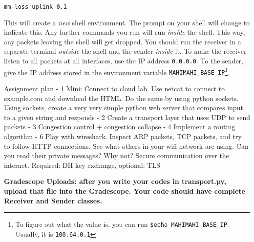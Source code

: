 \documentclass{article}
\begin{document}
\begin{verbatim}
mm-loss uplink 0.1
\end{verbatim}

This will create a \emph{new} shell environment. The prompt on your shell will change to indicate this. Any further commands you run will run \emph{inside} the shell. This way, any packets leaving the shell will get dropped. You should run the receiver in a separate terminal \emph{outside} the shell and the sender \emph{inside} it. To make the receiver listen to all packets at all interfaces, use the IP address {\tt 0.0.0.0}. To the sender, give the IP address stored in the environment variable {\tt MAHIMAHI\_BASE\_IP}\footnote{To figure out what the value is, you can run {\tt \$echo MAHIMAHI\_BASE\_IP}. Usually, it is {\tt 100.64.0.1}}.

  Assignment plan
  - 1 Mini: Connect to cloud lab. Use netcat to connect to example.com and download the HTML. Do the same by using python sockets. Using sockets, create a very very simple python web server that compares input to a given string and responds
  - 2 Create a transport layer that uses UDP to send packets
  - 3 Congestion control + congestion collapse
  - 4 Implement a routing algorithm
  - 6 Play with wireshark. Inspect ARP packets, TCP packets, and try to follow HTTP connections. See what others in your wifi network are using. Can you read their private messages? Why not? Secure communication over the internet. Required: DH key exchange, optional: TLS
\fi

\noindent\textbf{Gradescope Uploads: after you write your codes in transport.py, upload that file into the Gradescope. Your code should have complete Receiver and Sender classes.}
\end{document}
